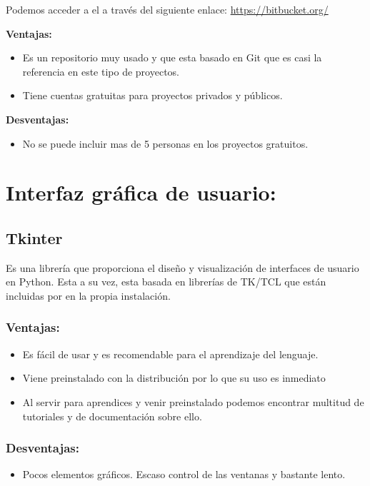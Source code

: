Podemos acceder a el a través del siguiente enlace: 
\url{https://bitbucket.org/}


\textbf{Ventajas:}
\begin{itemize}

\item Es un repositorio muy usado y que esta basado en Git que es casi la referencia en este tipo de proyectos.

\item Tiene cuentas gratuitas para proyectos privados y públicos.

\end{itemize}

\textbf{Desventajas:}

\begin{itemize}
\item No se puede incluir mas de 5 personas en los proyectos gratuitos.
\end{itemize}



\section{Interfaz gráfica de usuario:}
\subsection{Tkinter}
Es una librería que proporciona el diseño y visualización de interfaces de usuario en Python. Esta a su vez, esta basada en librerías de TK/TCL que están incluidas por en la propia instalación.

\subsubsection{Ventajas:}
\begin{itemize}
\item Es fácil de usar y es recomendable para el aprendizaje del lenguaje.

\item Viene preinstalado con la distribución por lo que su uso es inmediato

\item Al servir para aprendices y venir preinstalado podemos encontrar multitud de tutoriales y de documentación sobre ello.
\end{itemize}

\subsubsection{Desventajas:}
\begin{itemize}
\item Pocos elementos gráficos. Escaso control de las ventanas y bastante lento.
\end{itemize}

